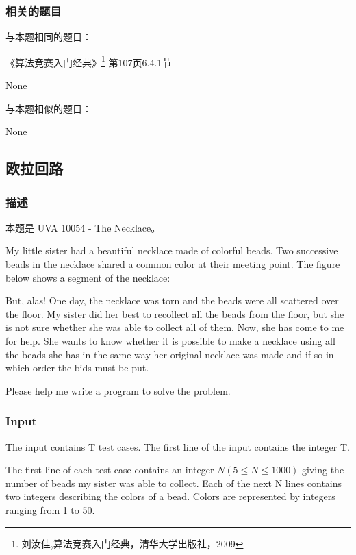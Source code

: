 \subsubsection{相关的题目}
与本题相同的题目：
\begindot
\item 《算法竞赛入门经典》\footnote{刘汝佳,算法竞赛入门经典，清华大学出版社，2009} 第107页6.4.1节
\item  None
\myenddot

与本题相似的题目：
\begindot
\item  None
\myenddot

\subsection{欧拉回路}

\subsubsection{描述}
本题是 UVA 10054 - The Necklace。

My little sister had a beautiful necklace made of colorful beads. Two successive beads in the 
necklace shared a common color at their meeting point. The figure below shows a segment of 
the necklace:

\centerline{}

But, alas! One day, the necklace was torn and the beads were all scattered over the floor. 
My sister did her best to recollect all the beads from the floor, but she is not sure 
whether she was able to collect all of them. Now, she has come to me for help. She wants
 to know whether it is possible to make a necklace using all the beads she has in the same
 way her original necklace was made and if so in which order the bids must be put.

Please help me write a program to solve the problem.

\subsubsection{Input}
The input contains T test cases. The first line of the input contains the integer T.

The first line of each test case contains an integer $N(5 \leq N \leq 1000)$ giving the number of beads 
my sister was able to collect. Each of the next N lines contains two integers describing 
the colors of a bead. Colors are represented by integers ranging from 1 to 50.

